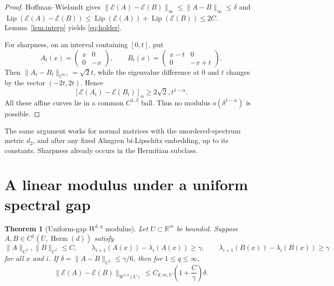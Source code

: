 \documentclass[10pt]{article}
\newtheorem{theorem}{Theorem}
\newcommand{\E}{\mathcal E}
\newcommand{\Herm}{\operatorname{Herm}}
\newcommand{\R}{\mathbb R}
\newcommand{\Lip}{\operatorname{Lip}}
\begin{document}
\begin{proof}
Hoffman--Wielandt gives
$\|\E(A)-\E(B)\|_\infty\leq\|A-B\|_\infty\leq\delta$ and
$\Lip(\E(A)-\E(B))\leq\Lip(\E(A))+\Lip(\E(B))\leq2C$.
Lemma~\ref{lem:interp} yields \eqref{eq:holder}.

For sharpness, on an interval containing $[0,t]$, put
\[
 A_t(x)=\begin{pmatrix}x&0\\0&-x\end{pmatrix},\qquad
 B_t(x)=\begin{pmatrix}x-t&0\\0&-x+t\end{pmatrix}.
\]
Then $\|A_t-B_t\|_{C^{0,1}}=\sqrt2t$, while the eigenvalue
difference at $0$ and $t$ changes by the vector $(-2t,2t)$.  Hence
\[
 [\E(A_t)-\E(B_t)]_\alpha\geq2\sqrt2,t^{1-\alpha}.
\]
All these affine curves lie in a common $C^{1,\beta}$ ball.  Thus no modulus
$o(\delta^{1-\alpha})$ is possible.
\end{proof}

The same argument works for normal matrices with the unordered-spectrum
metric $d_2$, and after any fixed Almgren bi-Lipschitz embedding, up to its
constants.  Sharpness already occurs in the Hermitian subclass.

\section{A linear modulus under a uniform spectral gap}

\begin{theorem}[Uniform-gap $W^{1,q}$ modulus]\label{thm:gap}
Let $U\subset\R^m$ be bounded.  Suppose
$A,B\in C^1(\overline U,\Herm(d))$ satisfy
\[
 \|A\|_{C^1},\|B\|_{C^1}\leq C,\qquad
 \lambda_{i+1}(A(x))-\lambda_i(A(x))\geq\gamma,\qquad
 \lambda_{i+1}(B(x))-\lambda_i(B(x))\geq\gamma
\]
for all $x$ and $i$.  If $\delta=\|A-B\|_{C^1}\leq\gamma/6$, then
for $1\leq q\leq\infty$,
\begin{equation}\label{eq:gap}
 \|\E(A)-\E(B)\|_{W^{1,q}(U)}
 \leq C_{d,m,U}\left(1+\frac C\gamma\right)\delta.
\end{equation}
\end{theorem}
\end{document}
